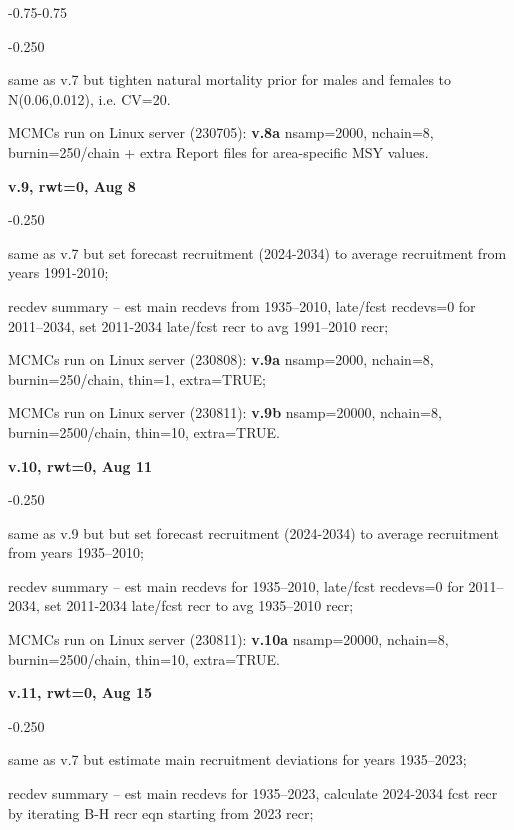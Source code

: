 \begin{itemize_csas}{-0.75}{-0.75}
	\begin{itemize_csas}{-0.25}{0}
		\item same as v.7 but tighten natural mortality prior for males and females to N(0.06,0.012), i.e. CV=20\pc{}.
		\item MCMCs run on Linux server (230705): \textbf{v.8a} nsamp=2000, nchain=8, burnin=250/chain + extra Report files for area-specific MSY values.
	\end{itemize_csas}
	\item \textbf{v.9, rwt=0, Aug 8}
	\begin{itemize_csas}{-0.25}{0}
		\item same as v.7 but set forecast recruitment (2024-2034) to average recruitment from years 1991-2010;
		\item recdev summary -- est main recdevs from 1935--2010, late/fcst recdevs=0 for 2011--2034, set 2011-2034 late/fcst recr to avg 1991--2010 recr;
		\item MCMCs run on Linux server (230808): \textbf{v.9a} nsamp=2000, nchain=8, burnin=250/chain, thin=1, extra=TRUE;
		\item MCMCs run on Linux server (230811): \textbf{v.9b} nsamp=20000, nchain=8, burnin=2500/chain, thin=10, extra=TRUE.
	\end{itemize_csas}
	\item \textbf{v.10, rwt=0, Aug 11}
	\begin{itemize_csas}{-0.25}{0}
		\item same as v.9 but but set forecast recruitment (2024-2034) to average recruitment from years 1935--2010;
		\item recdev summary -- est main recdevs for 1935--2010, late/fcst recdevs=0 for 2011--2034, set 2011-2034 late/fcst recr to avg 1935--2010 recr;
		\item MCMCs run on Linux server (230811): \textbf{v.10a} nsamp=20000, nchain=8, burnin=2500/chain, thin=10, extra=TRUE.
	\end{itemize_csas}
	\item \textbf{v.11, rwt=0, Aug 15}
	\begin{itemize_csas}{-0.25}{0}
		\item same as v.7 but estimate main recruitment deviations for years 1935--2023;
		\item recdev summary -- est main recdevs for 1935--2023, calculate 2024-2034 fcst recr by iterating B-H recr eqn starting from 2023 recr;

\end{itemize_csas}
\end{itemize_csas}
